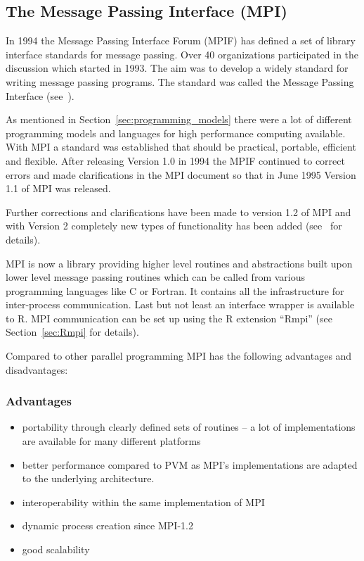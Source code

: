 \subsection{The Message Passing Interface (MPI)}
\label{sec:MPI}

In 1994 the Message Passing Interface Forum (MPIF) has defined a set
of library interface standards for message passing. Over 40
organizations participated in the discussion which started in
1993. The aim was to develop a widely standard for writing
message passing programs. The standard was called the Message Passing
Interface (see~\cite{forum94:MPI}).

As mentioned in Section~\ref{sec:programming_models} there
were a lot of different programming models and languages for high
performance computing available. With MPI a standard was established
that should be practical, portable, efficient and flexible. After
releasing Version 1.0 in 1994 the MPIF continued to correct errors and
made clarifications in the MPI document so that in June 1995 Version
1.1 of MPI was released.

Further corrections and clarifications have been made to version 1.2 of
MPI and with Version 2 completely new types of functionality has been
added (see~\cite{forum94:MPI-2} for details).

MPI is now a library providing higher level
routines and abstractions built upon lower level message passing
routines which can be called from various programming
languages like C or Fortran. It contains all the infrastructure for
inter-process communication. Last but not least an interface wrapper
is available to R. MPI communication can be set up using the R extension
``Rmpi'' (see Section~\ref{sec:Rmpi} for details).


Compared to other parallel programming MPI has the following
advantages and disadvantages:

\subsubsection{Advantages}
\begin{itemize}
\item portability through clearly defined sets of routines -- a lot of
  implementations are available for many different platforms
\item better performance compared to PVM as MPI's implementations are
  adapted to the underlying architecture.
\item interoperability within the same implementation of MPI
\item dynamic process creation since MPI-1.2
\item good scalability
\end{itemize} 

